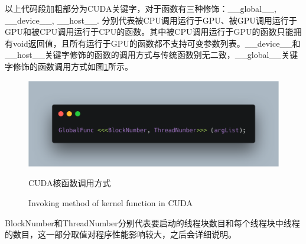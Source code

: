 \par 以上代码段加粗部分为CUDA关键字，对于函数有三种修饰：\_\_global\_\_, \_\_device\_\_, \_\_host\_\_. 分别代表被CPU调用运行于GPU、被GPU调用运行于GPU和被CPU调用运行于CPU的函数。其中被CPU调用运行于GPU的函数只能拥有void返回值，且所有运行于GPU的函数都不支持可变参数列表\parencite{EVENEASIER}。\_\_device\_\_和\_\_host\_\_关键字修饰的函数的调用方式与传统函数别无二致，\_\_global\_\_关键字修饰的函数调用方式如图\ref{Fig.4}所示。
\begin{figure}
	\centering
	\includegraphics[width=15cm]{figures/CODE3.png}
	\renewcommand{\thefigure}{\arabic{section}-\arabic{figure} }
	\renewcommand{\figurename}{图}
	\caption{CUDA核函数调用方式}
	\addtocounter{figure}{-1}
	\renewcommand{\thefigure}{\arabic{section}-\arabic{figure} }
	\renewcommand{\figurename}{Figure}
	\caption{Invoking method of kernel function in CUDA}
	\label{Fig.4}
\end{figure}
BlockNumber和ThreadNumber分别代表要启动的线程块数目和每个线程块中线程的数目，这一部分取值对程序性能影响较大，之后会详细说明。

